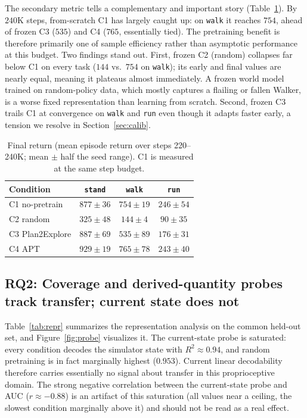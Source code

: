 \documentclass{article}
\begin{document}
The secondary metric tells a complementary and important story
(Table~\ref{tab:final}). By $240$K steps, from-scratch C1 has largely caught up:
on \texttt{walk} it reaches $754$, ahead of frozen C3 ($535$) and C4 ($765$,
essentially tied). The pretraining benefit is therefore primarily one of
sample efficiency rather than asymptotic performance at this budget. Two
findings stand out. First, frozen C2 (random) collapses far below C1 on every
task ($144$ vs.\ $754$ on \texttt{walk}); its early and final values are nearly
equal, meaning it plateaus almost immediately. A frozen world model trained on
random-policy data, which mostly captures a flailing or fallen Walker, is a
worse fixed representation than learning from scratch. Second, frozen C3 trails
C1 at convergence on \texttt{walk} and \texttt{run} even though it adapts faster
early, a tension we resolve in Section~\ref{sec:calib}.

\begin{table}[t]
\centering
\caption{Final return (mean episode return over steps 220--240K; mean $\pm$ half
the seed range). C1 is measured at the same step budget.}
\label{tab:final}
\begin{tabular}{lccc}
\toprule
Condition & \texttt{stand} & \texttt{walk} & \texttt{run} \\
\midrule
C1 no-pretrain   & $877 \pm 36$ & $754 \pm 19$ & $246 \pm 54$ \\
C2 random        & $325 \pm 48$ & $144 \pm 4$  & $90 \pm 35$ \\
C3 Plan2Explore  & $887 \pm 69$ & $535 \pm 89$ & $176 \pm 31$ \\
C4 APT           & $929 \pm 19$ & $765 \pm 78$ & $243 \pm 40$ \\
\bottomrule
\end{tabular}
\end{table}

\subsection{RQ2: Coverage and derived-quantity probes track transfer; current
state does not}

Table~\ref{tab:repr} summarizes the representation analysis on the common
held-out set, and Figure~\ref{fig:probe} visualizes it. The current-state probe
is saturated: every condition decodes the simulator state with $R^2 \approx
0.94$, and random pretraining is in fact marginally highest ($0.953$). Current
linear decodability therefore carries essentially no signal about transfer in
this proprioceptive domain. The strong negative correlation between the
current-state probe and AUC ($r\approx -0.88$) is an artifact of this saturation
(all values near a ceiling, the slowest condition marginally above it) and
should not be read as a real effect.
\end{document}
